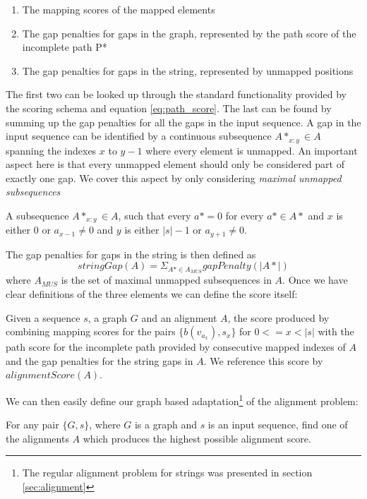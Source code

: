 \documentclass[thesis.tex]{subfiles}
\begin{document}
{\begin{enumerate}
  \item The mapping scores of the mapped elements
  \item The gap penalties for gaps in the graph, represented by the path score of the incomplete path P*
  \item The gap penalties for gaps in the string, represented by unmapped positions
\end{enumerate}
The first two can be looked up through the standard functionality provided by the scoring schema and equation \ref{eq:path_score}. The last can be found by summing up the gap penalties for all the gaps in the input sequence. A gap in the input sequence can be identified by a continuous subsequence $A*_{x:y} \in A$ spanning the indexes $x$ to $y-1$ where every element is unmapped. An important aspect here is that every unmapped element should only be considered part of exactly one gap. We cover this aspect by only considering \textit{maximal unmapped subsequences}
\begin{defn}
  A subsequence $A*_{x:y} \in A$, such that every $a*=0$ for every $a* \in A*$ and $x$ is either $0$ or $a_{x-1} \neq 0$ and $y$ is either $|s|-1$ or $a_{y+1} \neq 0$.
\end{defn}
The gap penalties for gaps in the string is then defined as 
\begin{equation}
  stringGap(A)=\Sigma_{A* \in A_{MUS}} gapPenalty(|A*|)
\end{equation}
where $A_{MUS}$ is the set of maximal unmapped subsequences in $A$. Once we have clear definitions of the three elements we can define the score itself:
\begin{defn}
  Given a sequence $s$, a graph $G$ and an alignment $A$, the score produced by combining mapping scores for the pairs $\{b(v_{a_x}), s_x\}$ for $0<=x<|s|$ with the path score for the incomplete path provided by consecutive mapped indexes of $A$ and the gap penalties for the string gaps in $A$. We reference this score by $alignmentScore(A)$.
\end{defn}
We can then easily define our graph based adaptation\footnote{The regular alignment problem for strings was presented in section \ref{sec:alignment}} of the alignment problem:
\begin{defn}
  For any pair $\{G, s\}$, where $G$ is a graph and $s$ is an input sequence, find one of the alignments $A$ which produces the highest possible alignment score.

\end{defn}}
\end{document}
